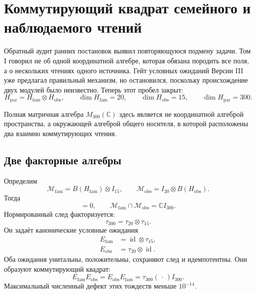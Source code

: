 \chapter{Коммутирующий квадрат семейного и наблюдаемого чтений}

Обратный аудит ранних постановок выявил повторяющуюся подмену задачи. Том I
говорил не об одной координатной алгебре, которая обязана породить все поля,
а о нескольких чтениях одного источника. Гейт условных ожиданий Версии III
уже предлагал правильный механизм, но остановился, поскольку происхождение
двух модулей было неизвестно. Теперь этот пробел закрыт:
\begin{equation}
 H_{\mathrm{par}}
 =H_{\mathrm{fam}}\otimes H_{\mathrm{obs}},
 \qquad
 \dim H_{\mathrm{fam}}=20,
 \qquad
 \dim H_{\mathrm{obs}}=15,
 \qquad
 \dim H_{\mathrm{par}}=300.
 \label{eq:v5-commuting-square-factorization}
\end{equation}

Полная матричная алгебра $M_{300}(\mathbb C)$ здесь является не
координатной алгеброй пространства, а окружающей алгеброй общего носителя,
в которой расположены два взаимно коммутирующих чтения.

\section{Две факторные алгебры}

Определим
\begin{equation}
 \mathcal M_{\mathrm{fam}}
 =B(H_{\mathrm{fam}})\otimes I_{15},
 \qquad
 \mathcal M_{\mathrm{obs}}
 =I_{20}\otimes B(H_{\mathrm{obs}}).
\end{equation}
Тогда
\begin{equation}
 [\mathcal M_{\mathrm{fam}},\mathcal M_{\mathrm{obs}}]=0,
 \qquad
 \mathcal M_{\mathrm{fam}}\cap\mathcal M_{\mathrm{obs}}
 =\mathbb C I_{300}.
\end{equation}
Нормированный след факторизуется:
\begin{equation}
 \tau_{300}=\tau_{20}\otimes\tau_{15}.
\end{equation}
Он задаёт канонические условные ожидания
\begin{equation}
 \begin{aligned}
 E_{\mathrm{fam}}&=\operatorname{id}\otimes\tau_{15},\\
 E_{\mathrm{obs}}&=\tau_{20}\otimes\operatorname{id}.
 \end{aligned}
 \label{eq:v5-factor-expectations}
\end{equation}
Оба ожидания унитальны, положительны, сохраняют след и идемпотентны. Они
образуют коммутирующий квадрат:
\begin{equation}
 E_{\mathrm{fam}}E_{\mathrm{obs}}
 =E_{\mathrm{obs}}E_{\mathrm{fam}}
 =\tau_{300}(\,\cdot\,)I_{300}.
 \label{eq:v5-commuting-square}
\end{equation}
Максимальный численный дефект этих тождеств меньше $10^{-14}$.

